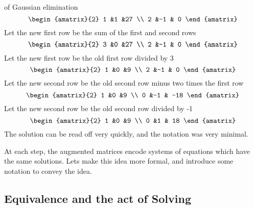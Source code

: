 \begin{example} of Gaussian elimination
\[
 \begin{amatrix}{2}
1 &1 &27 \\ 2 &-1 & 0
\end{amatrix}
\]
Let the new first row be the sum of the first and second rows
\[
 \begin{amatrix}{2}
3 &0 &27 \\ 2 &-1 & 0
\end{amatrix}
\]
Let the new first row be the old first row divided by 3
\[
 \begin{amatrix}{2}
1 &0 &9 \\ 2 &-1 & 0
\end{amatrix}
\]
Let the new second row be the old second row minus two times the first row 
\[
 \begin{amatrix}{2}
1 &0 &9 \\ 0 &-1 & -18
\end{amatrix}
\]
Let the new  second row be the old second row divided by -1
\[
 \begin{amatrix}{2}
1 &0 &9 \\ 0 &1 & 18
\end{amatrix}
\]
The solution can be read off very quickly, and the notation was very minimal. 
\end{example}
 At each step, the augmented matrices encode systems of equations which have the same solutions. Lets make this idea more formal, and introduce some notation to convey the idea.

\subsection{Equivalence and the act of Solving}

